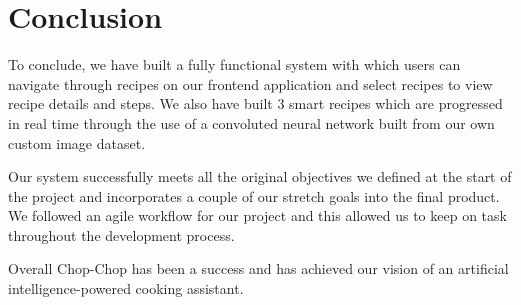 \documentclass{article}
\begin{document}
\section{Conclusion}
To conclude, we have built a fully functional system with which users can navigate through recipes on our frontend application and select recipes to view recipe details and steps. We also have built 3 smart recipes which are progressed in real time through the use of a convoluted neural network built from our own custom image dataset.

Our system successfully meets all the original objectives we defined at the start of the project and incorporates a couple of our stretch goals into the final product. We followed an agile workflow for our project and this allowed us to keep on task throughout the development process.

Overall Chop-Chop has been a success and has achieved our vision of an artificial intelligence-powered cooking assistant.

\pagebreak







\end{document}
